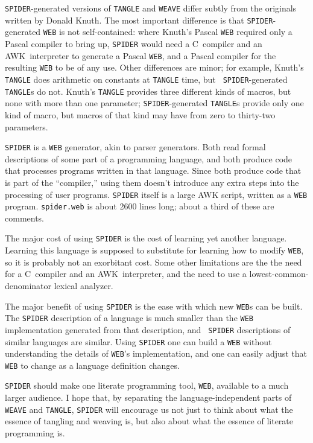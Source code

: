 \medskip

{\tt SPIDER}-generated versions of {\tt TANGLE} and {\tt WEAVE} differ
subtly from the originals written by Donald Knuth.
The most important difference is that {\tt SPIDER}-generated {\tt WEB}
is not self-contained: where Knuth's Pascal {\tt WEB} required only a
Pascal compiler to bring up, {\tt SPIDER} would need a C~compiler and
an AWK~interpreter to generate a Pascal {\tt WEB}, and a Pascal
compiler for the resulting {\tt WEB} to be of any use.
Other differences are minor; for example, Knuth's {\tt TANGLE}
does arithmetic on constants at {\tt TANGLE} time, but {\tt
SPIDER}-generated {\tt TANGLE}s do not.
Knuth's {\tt TANGLE} provides three different kinds of macros, but
none with more than one parameter;
{\tt SPIDER}-generated {\tt TANGLE}s provide only one kind of macro,
but macros of that kind may have from zero to thirty-two parameters.



{\tt SPIDER} is a {\tt WEB} generator, akin to parser generators.
Both read formal descriptions of some part of a programming language,
and both produce code that processes programs written in that language.
Since both produce code that is part of the ``compiler,'' using them
doesn't introduce any extra steps into the processing of user programs.
{\tt SPIDER} itself is a large AWK script, written as a {\tt WEB}
program.  
{\tt spider.web} is about 2600 lines long; about a third of these are
comments. 


The major cost of using {\tt SPIDER} is the cost of learning yet
another language.
Learning this language is supposed to substitute for learning how to
modify {\tt WEB}, so it is probably not an exorbitant cost.
Some other limitations are the the need for a C~compiler and an
AWK~interpreter, and the need to use a lowest-common-denominator
lexical analyzer. 

The major benefit of using {\tt SPIDER} is the ease with which new
{\tt WEB}s can be built.
The {\tt SPIDER} description of a language is much smaller than the
{\tt WEB} implementation generated from that description, and {\tt
SPIDER} descriptions of similar languages are similar.
Using {\tt SPIDER} one can build a {\tt WEB} without understanding the
details of {\tt WEB}'s implementation, and one can easily adjust that
{\tt WEB} to change as a language definition changes.



{\tt SPIDER}  should make one literate programming tool, {\tt WEB},
available to a much larger audience.
I hope that, by separating the language-independent parts of {\tt WEAVE}
and {\tt TANGLE}, {\tt SPIDER} will  encourage us not just to think
about what the essence of tangling and weaving is, but also about what
the essence of literate programming is.


